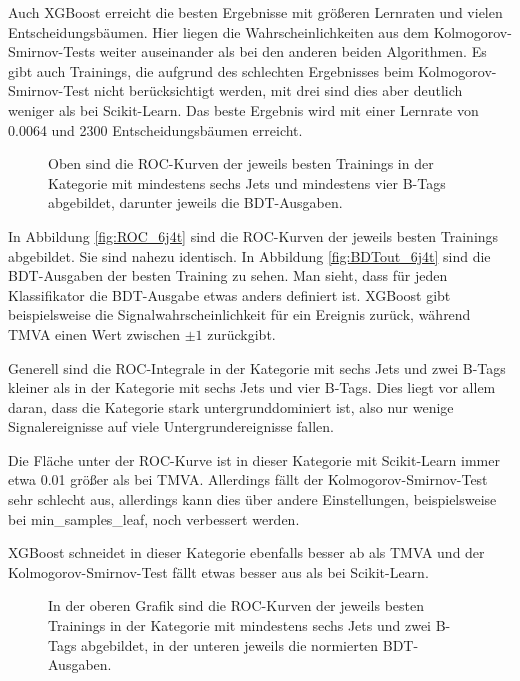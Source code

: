 Auch XGBoost erreicht die besten Ergebnisse mit gr\"o\ss eren Lernraten und vielen Entscheidungsb\"aumen. Hier liegen die Wahrscheinlichkeiten aus dem Kolmogorov-Smirnov-Tests weiter auseinander als bei den anderen beiden Algorithmen. Es gibt auch Trainings, die aufgrund des schlechten Ergebnisses beim Kolmogorov-Smirnov-Test nicht ber\"ucksichtigt werden, mit drei sind dies aber deutlich weniger als bei Scikit-Learn. Das beste Ergebnis wird mit einer Lernrate von \num{0,0064} und \num{2300} Entscheidungsb\"aumen erreicht.

\begin{figure}[tbp]
\centering     %
{}
\parbox[b]{12cm}{
\caption{Oben sind die ROC-Kurven der jeweils besten Trainings in der Kategorie mit mindestens sechs Jets und mindestens vier B-Tags abgebildet, darunter jeweils die BDT-Ausgaben.}}
\end{figure}

In Abbildung \ref{fig:ROC_6j4t} sind die ROC-Kurven der jeweils besten Trainings abgebildet. Sie sind nahezu identisch. In Abbildung \ref{fig:BDTout_6j4t} sind die BDT-Ausgaben der besten Training zu sehen. Man sieht, dass f\"ur jeden Klassifikator die BDT-Ausgabe etwas anders definiert ist. XGBoost gibt beispielsweise die Signalwahrscheinlichkeit f\"ur ein Ereignis zur\"uck, w\"ahrend TMVA einen Wert zwischen $\pm1$ zur\"uckgibt.

Generell sind die ROC-Integrale in der Kategorie mit sechs Jets und zwei B-Tags kleiner als in der Kategorie mit sechs Jets und vier B-Tags. Dies liegt vor allem daran, dass die Kategorie stark untergrunddominiert ist, also nur wenige Signalereignisse auf viele Untergrundereignisse fallen.

Die Fl\"ache unter der ROC-Kurve ist in dieser Kategorie mit Scikit-Learn immer etwa \num{0,01} gr\"o\ss er als bei TMVA. Allerdings f\"allt der Kolmogorov-Smirnov-Test sehr schlecht aus, allerdings kann dies \"uber andere Einstellungen, beispielsweise bei min\_samples\_leaf, noch verbessert werden.

XGBoost schneidet in dieser Kategorie ebenfalls besser ab als TMVA und der Kolmogorov-Smirnov-Test f\"allt etwas besser aus als bei Scikit-Learn.

\begin{figure}[tbp]
\centering     %
{}
\parbox[b]{12cm}{
\caption{In der oberen Grafik sind die ROC-Kurven der jeweils besten Trainings in der Kategorie mit mindestens sechs Jets und zwei B-Tags abgebildet, in der unteren jeweils die normierten BDT-Ausgaben.}}
\end{figure}

